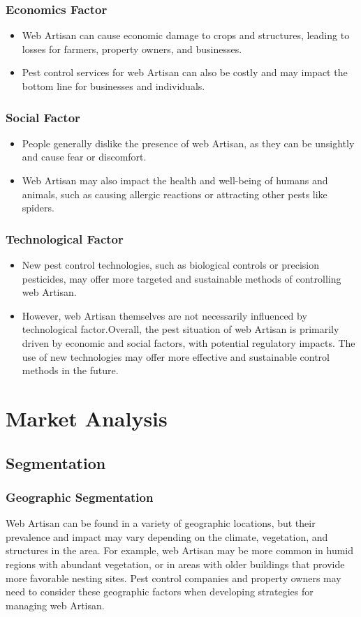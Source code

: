 \documentclass[12pt,a4paper]{article}
\begin{document}
\subsubsection{Economics Factor}
\begin{itemize}
    \item Web Artisan can cause economic damage to crops and structures, leading to losses for farmers, property owners, and businesses.
    \item Pest control services for web Artisan can also be costly and may impact the bottom line for businesses and individuals.    
\end{itemize}
\subsubsection{Social Factor}
\begin{itemize}
    \item People generally dislike the presence of web Artisan, as they can be unsightly and cause fear or discomfort.
    \item Web Artisan may also impact the health and well-being of humans and animals, such as causing allergic reactions or attracting other pests like spiders.
\end{itemize}
\subsubsection{Technological Factor}
\begin{itemize}
    \item New pest control technologies, such as biological controls or precision pesticides, may offer more targeted and sustainable methods of controlling web Artisan.
    \item However, web Artisan themselves are not necessarily influenced by technological factor.Overall, the pest situation of web Artisan is primarily driven by economic and social factors, with potential regulatory impacts. The use of new technologies may offer more effective and sustainable control methods in the future.
\end{itemize}
\section{Market Analysis}
\subsection{Segmentation}
\subsubsection{Geographic Segmentation}
Web Artisan can be found in a variety of geographic locations, but their prevalence and impact may vary depending on the climate, vegetation, and structures in the area. For example, web Artisan may be more common in humid regions with abundant vegetation, or in areas with older buildings that provide more favorable nesting sites. Pest control companies and property owners may need to consider these geographic factors when developing strategies for managing web Artisan.
\end{document}
